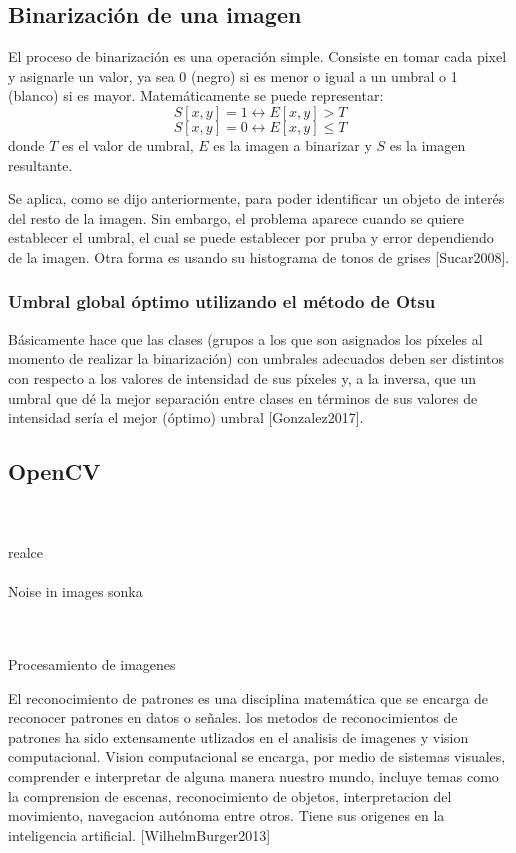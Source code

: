 \subsection{Binarización de una imagen}
El proceso de binarización es una operación simple. Consiste en tomar cada pixel y asignarle un valor, ya sea 0 (negro) si es menor o igual a un umbral o 1 (blanco) si es mayor. Matemáticamente se puede representar: 
\[
S[x, y] = 1 \longleftrightarrow E[x, y] > T
\]
\[
S[x, y] = 0 \longleftrightarrow E[x, y] \leq T
\]
donde $T$ es el valor de umbral, $E$ es la imagen a binarizar y $S$ es la imagen resultante.

Se aplica, como se dijo anteriormente, para poder identificar un objeto de interés del resto de la imagen. Sin embargo, el problema aparece cuando se quiere establecer el umbral, el cual se puede establecer por pruba y error dependiendo de la imagen. Otra forma es usando su histograma de tonos de grises [Sucar2008].

\subsubsection{Umbral global óptimo utilizando el método de Otsu}
Básicamente hace que las clases (grupos a los que son asignados los píxeles al momento de realizar la binarización) con umbrales adecuados deben ser distintos con respecto a los valores de intensidad de sus píxeles y, a la inversa, que un umbral que dé la mejor separación entre clases en términos de sus valores de intensidad sería el mejor (óptimo) umbral [Gonzalez2017].

\subsection{OpenCV}

\\\\
realce
\\\\
Noise in images sonka

\\\\
Procesamiento de imagenes

El reconocimiento de patrones es una disciplina matemática que se encarga de reconocer patrones en datos o señales. los metodos de reconocimientos de patrones ha sido extensamente utlizados en el analisis de imagenes y vision computacional.
Vision computacional se encarga, por medio de sistemas visuales, comprender e interpretar de alguna manera nuestro mundo, incluye temas como la comprension de escenas, reconocimiento de objetos, interpretacion del movimiento, navegacion autónoma entre otros. Tiene sus origenes en la inteligencia artificial. [WilhelmBurger2013]




